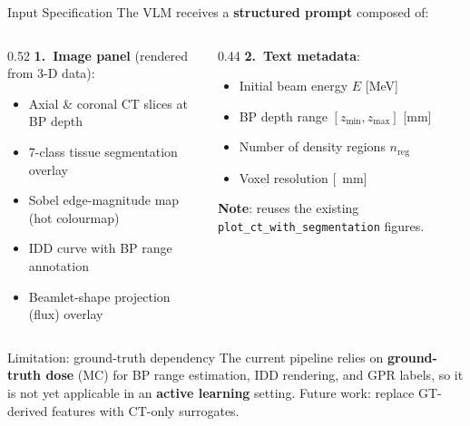 \documentclass[aspectratio=169, 10pt]{beamer}
\begin{document}
\begin{frame}{Input Specification}
  The VLM receives a \textbf{structured prompt} composed of:

  \vspace{2pt}
  \begin{columns}[T]
    \begin{column}{0.52\textwidth}
      \textbf{1.\ Image panel} (rendered from 3-D data):
      \begin{itemize}\setlength{\itemsep}{1pt}
        \item Axial \& coronal CT slices at BP depth
        \item 7-class tissue segmentation overlay
        \item Sobel edge-magnitude map (hot colourmap)
        \item IDD curve with BP range annotation
        \item Beamlet-shape projection (flux) overlay
      \end{itemize}
    \end{column}
    \begin{column}{0.44\textwidth}
      \textbf{2.\ Text metadata}:
      \begin{itemize}\setlength{\itemsep}{1pt}
        \item Initial beam energy $E$ [MeV]
        \item BP depth range $[z_{\min}, z_{\max}]$ [mm]
        \item Number of density regions $n_{\text{reg}}$
        \item Voxel resolution [\SI{}{mm}]
      \end{itemize}

      \vspace{4pt}
      {\footnotesize\textbf{Note}: reuses the existing
      \texttt{plot\_ct\_with\_segmentation} figures.}
    \end{column}
  \end{columns}

  \vspace{4pt}
  \begin{alertblock}{\footnotesize Limitation: ground-truth dependency}
    {\footnotesize The current pipeline relies on \textbf{ground-truth dose}
    (MC) for BP range estimation, IDD rendering, and GPR labels,
    so it is not yet applicable in an \textbf{active learning} setting.
    Future work: replace GT-derived features with CT-only surrogates.}
  \end{alertblock}
\end{frame}
\end{document}
